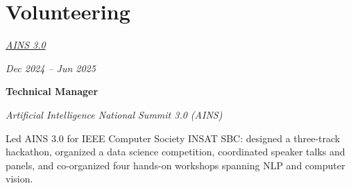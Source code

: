\section{Volunteering}

\begin{twocolentry}{
    \textit{\href{https://www.ai-national-summit.tech}{AINS 3.0}}

    \textit{Dec 2024 – Jun 2025}}
    \textbf{Technical Manager}

    \textit{Artificial Intelligence National Summit 3.0 (AINS)}
\end{twocolentry}
\vspace{0.10 cm}
\begin{onecolentry}
    \begin{highlights}
        \item Led AINS 3.0 for IEEE Computer Society INSAT SBC: designed a three-track hackathon, organized a data science competition, coordinated speaker talks and panels, and co-organized four hands-on workshops spanning NLP and computer vision.
    \end{highlights}
\end{onecolentry}
